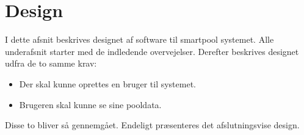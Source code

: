 \chapter{Design}

I dette afsnit beskrives designet af software til \gls{smartpool} systemet. Alle underafsnit starter med de indledende overvejelser. Derefter beskrives designet udfra de to samme krav: 

\begin{itemize}
	\item Der skal kunne oprettes en bruger til systemet.
	\item Brugeren skal kunne se sine pooldata.
\end{itemize}

Disse to bliver så gennemgået.
Endeligt præsenteres det afslutningsvise design.


%
%
